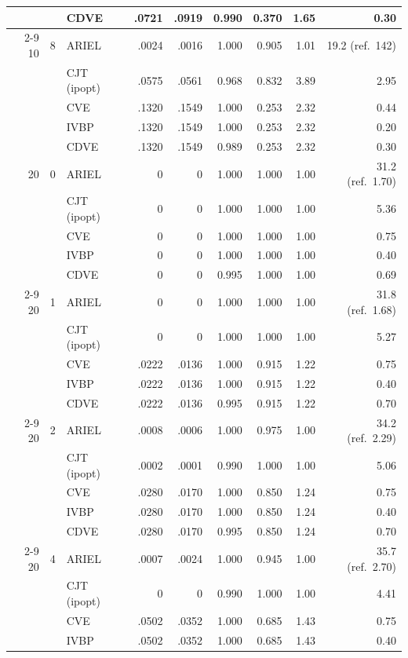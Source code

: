 \begin{table}[htbp]
\begin{tabular}{rrlrrrrrr}
 &  & CDVE & .0721 & .0919 & 0.990 & 0.370 & 1.65 & 0.30 \\
\cmidrule(l){2-9}
10 & 8 & ARIEL & .0024 & .0016 & 1.000 & 0.905 & 1.01 & 19.2 (ref.\ 142) \\
 &  & CJT (ipopt) & .0575 & .0561 & 0.968 & 0.832 & 3.89 & 2.95 \\
 &  & CVE & .1320 & .1549 & 1.000 & 0.253 & 2.32 & 0.44 \\
 &  & IVBP & .1320 & .1549 & 1.000 & 0.253 & 2.32 & 0.20 \\
 &  & CDVE & .1320 & .1549 & 0.989 & 0.253 & 2.32 & 0.30 \\
\midrule
20 & 0 & ARIEL & 0 & 0 & 1.000 & 1.000 & 1.00 & 31.2 (ref.\ 1.70) \\
 &  & CJT (ipopt) & 0 & 0 & 1.000 & 1.000 & 1.00 & 5.36 \\
 &  & CVE & 0 & 0 & 1.000 & 1.000 & 1.00 & 0.75 \\
 &  & IVBP & 0 & 0 & 1.000 & 1.000 & 1.00 & 0.40 \\
 &  & CDVE & 0 & 0 & 0.995 & 1.000 & 1.00 & 0.69 \\
\cmidrule(l){2-9}
20 & 1 & ARIEL & 0 & 0 & 1.000 & 1.000 & 1.00 & 31.8 (ref.\ 1.68) \\
 &  & CJT (ipopt) & 0 & 0 & 1.000 & 1.000 & 1.00 & 5.27 \\
 &  & CVE & .0222 & .0136 & 1.000 & 0.915 & 1.22 & 0.75 \\
 &  & IVBP & .0222 & .0136 & 1.000 & 0.915 & 1.22 & 0.40 \\
 &  & CDVE & .0222 & .0136 & 0.995 & 0.915 & 1.22 & 0.70 \\
\cmidrule(l){2-9}
20 & 2 & ARIEL & .0008 & .0006 & 1.000 & 0.975 & 1.00 & 34.2 (ref.\ 2.29) \\
 &  & CJT (ipopt) & .0002 & .0001 & 0.990 & 1.000 & 1.00 & 5.06 \\
 &  & CVE & .0280 & .0170 & 1.000 & 0.850 & 1.24 & 0.75 \\
 &  & IVBP & .0280 & .0170 & 1.000 & 0.850 & 1.24 & 0.40 \\
 &  & CDVE & .0280 & .0170 & 0.995 & 0.850 & 1.24 & 0.70 \\
\cmidrule(l){2-9}
20 & 4 & ARIEL & .0007 & .0024 & 1.000 & 0.945 & 1.00 & 35.7 (ref.\ 2.70) \\
 &  & CJT (ipopt) & 0 & 0 & 0.990 & 1.000 & 1.00 & 4.41 \\
 &  & CVE & .0502 & .0352 & 1.000 & 0.685 & 1.43 & 0.75 \\
 &  & IVBP & .0502 & .0352 & 1.000 & 0.685 & 1.43 & 0.40 \\

\end{tabular}
\end{table}
